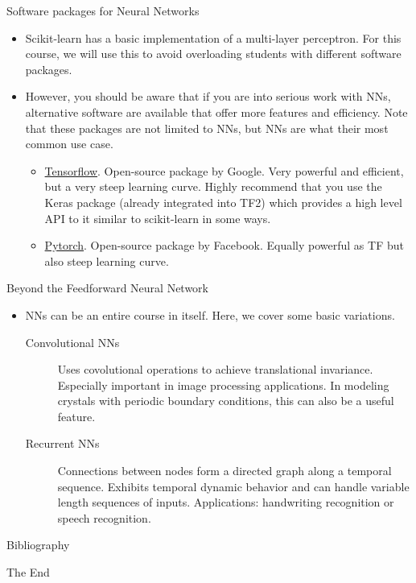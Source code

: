 \documentclass{beamer}
\begin{document}
\begin{frame}{Software packages for Neural Networks}
    \begin{itemize}
        \item Scikit-learn has a basic implementation of a multi-layer perceptron. For this course, we will use this to avoid overloading students with different software packages.
        \item However, you should be aware that if you are into serious work with NNs, alternative software are available that offer more features and efficiency. Note that these packages are not limited to NNs, but NNs are what their most common use case.
        \begin{itemize}
            \item \href{https://www.tensorflow.org/}{Tensorflow}. Open-source package by Google. Very powerful and efficient, but a very steep learning curve. Highly recommend that you use the Keras package (already integrated into TF2) which provides a high level API to it similar to scikit-learn in some ways.
            \item \href{https://pytorch.org/}{Pytorch}. Open-source package by Facebook. Equally powerful as TF but also steep learning curve.
        \end{itemize}
    \end{itemize}
\end{frame}


\begin{frame}{Beyond the Feedforward Neural Network}
    \begin{itemize}
        \item NNs can be an entire course in itself. Here, we cover some basic variations.
        \begin{description}
        \item[Convolutional NNs] Uses covolutional operations to achieve translational invariance. Especially important in image processing applications. In modeling crystals with periodic boundary conditions, this can also be a useful feature.
        \item[Recurrent NNs] Connections between nodes form a directed graph along a temporal sequence. Exhibits temporal dynamic behavior and can handle variable length sequences of inputs. Applications: handwriting recognition or speech recognition.
        \end{description}
        
    \end{itemize}
\end{frame}


\begin{frame}{Bibliography}
    
    
\end{frame}


\begin{frame}
    \Huge{\centerline{The End}}
\end{frame}
\end{document}
